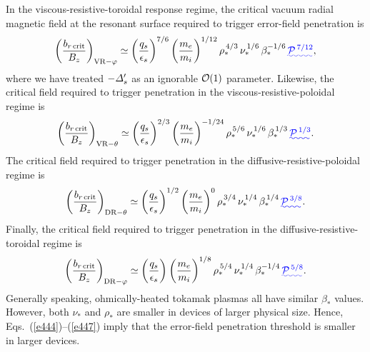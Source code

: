 \documentclass[12pt,prb,aps]{revtex4-1}
\providecommand{\DIFadd}[1]{{\protect\color{blue}\uwave{#1}}} %
\providecommand{\DIFaddbegin}{} %
\providecommand{\DIFaddend}{} %
\begin{document}
In the viscous-resistive-toroidal response regime, the critical vacuum radial magnetic
field at the resonant surface required to
trigger error-field penetration is\,\cite{cole}
\begin{equation}\label{e444}
\left(\frac{b_{r\,{\rm crit}}}{B_z}\right)_{{\rm VR}-\varphi} \simeq \left(\frac{q_s}{\epsilon_s}\right)^{7/6}\left(\frac{m_e}{m_i}\right)^{1/12}
\rho_\ast^{\,4/3}\,\nu_\ast^{\,1/6}\,\beta_\ast^{-1/6}\DIFaddbegin \DIFadd{\,{\cal P}^{\,7/12}}\DIFaddend ,
\end{equation}
where we have treated $-{\mit\Delta}_s'$ as an ignorable ${\cal O}(1)$ parameter. Likewise,  the critical
field required to trigger penetration in the viscous-resistive-poloidal regime is
\begin{equation}
\left(\frac{b_{r\,{\rm crit}}}{B_z}\right)_{{\rm VR}-\theta} \simeq  \left(\frac{q_s}{\epsilon_s}\right)^{2/3}\left(\frac{m_e}{m_i}\right)^{-1/24}
\rho_\ast^{\,5/6}\,\nu_\ast^{\,1/6}\,\beta_\ast^{\,1/3}\DIFaddbegin \DIFadd{\,{\cal P}^{\,1/3}}\DIFaddend .
\end{equation}
The critical field required to trigger penetration in the diffusive-resistive-poloidal regime is
\begin{equation}
\left(\frac{b_{r\,{\rm crit}}}{B_z}\right)_{{\rm DR}-\theta} \simeq  \left(\frac{q_s}{\epsilon_s}\right)^{1/2}\left(\frac{m_e}{m_i}\right)^{0}
\rho_\ast^{\,3/4}\,\nu_\ast^{\,1/4}\,\beta_\ast^{\,1/4}\DIFaddbegin \DIFadd{\,{\cal P}^{\,3/8}}\DIFaddend .
\end{equation}
Finally, the critical field 
required to  trigger penetration in the diffusive-resistive-toroidal regime is
\begin{equation}
\left(\frac{b_{r\,{\rm crit}}}{B_z}\right)_{{\rm DR}-\varphi} \simeq  \left(\frac{q_s}{\epsilon_s}\right)^{}\left(\frac{m_e}{m_i}\right)^{1/8}
\rho_\ast^{\,5/4}\,\nu_\ast^{\,1/4}\,\beta_\ast^{-1/4}\DIFaddbegin \DIFadd{\,{\cal P}^{\,5/8}}\DIFaddend .\label{e447}
\end{equation}
Generally speaking, ohmically-heated tokamak plasmas all  have similar $\beta_\ast$ values. However,
both $\nu_\ast$ and $\rho_\ast$ are smaller in devices of larger physical size. Hence, Eqs.~(\ref{e444})--(\ref{e447})
imply that the error-field penetration threshold is smaller in larger devices. 
\end{document}
